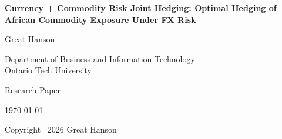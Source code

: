 \documentclass{article}
\begin{document}
\begin{titlepage}
\centering

\vspace*{2cm}

{\Huge\bfseries
Currency + Commodity Risk Joint Hedging:
Optimal Hedging of African Commodity Exposure Under FX Risk
\par}

\vspace{1.5cm}

{\Large Great Hanson}

\vspace{0.5cm}

Department of Business and Information Technology\\
Ontario Tech University

\vfill

Research Paper

\vspace{0.5cm}

\today

\vfill

Copyright \textcopyright\ 2026 Great Hanson

\end{titlepage}
\end{document}
